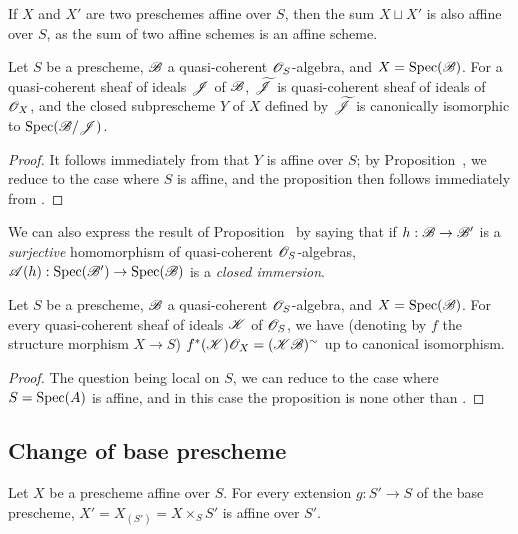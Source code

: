 \begin{remark}[1.4.9]
\label{II.1.4.9}
If $X$ and $X'$ are two preschemes affine over $S$, then the sum $X\sqcup X'$ is also affine over $S$, as the sum of two affine schemes is an affine scheme.
\end{remark}

\begin{proposition}[1.4.10]
\label{II.1.4.10}
Let $S$ be a prescheme, $\mathscr{B}$ a quasi-coherent $\mathscr{O}_S$-algebra, and $X=\operatorname{Spec}(\mathscr{B})$.
For a quasi-coherent sheaf of ideals $\mathscr{J}$ of $\mathscr{B}$, $\widetilde{\mathscr{J}}$ is quasi-coherent sheaf of ideals of $\mathscr{O}_X$, and the closed subprescheme $Y$ of $X$ defined by $\widetilde{\mathscr{J}}$ is canonically isomorphic to $\operatorname{Spec}(\mathscr{B}/\mathscr{J})$.
\end{proposition}

\begin{proof}
It follows immediately from  that $Y$ is affine over $S$; by Proposition~, we reduce to the case where $S$ is affine, and the proposition then follows immediately from .
\end{proof}

We can also express the result of Proposition~ by saying that if $h:\sh{B}\to\sh{B}'$ is a \emph{surjective} homomorphism of quasi-coherent $\mathscr{O}_S$-algebras, $\sh{A}(h):\Spec(\sh{B}')\to\Spec(\sh{B})$ is a \emph{closed immersion}.

\begin{proposition}[1.4.11]
\label{II.1.4.11}
Let $S$ be a prescheme, $\mathscr{B}$ a quasi-coherent $\mathscr{O}_S$-algebra, and $X=\operatorname{Spec}(\mathscr{B})$.
For every quasi-coherent sheaf of ideals $\mathscr{K}$ of $\mathscr{O}_S$, we have (denoting by $f$ the structure morphism $X\to S$) $f^*(\mathscr{K})\mathscr{O}_X=(\mathscr{K}\mathscr{B})^\sim$ up to canonical isomorphism.
\end{proposition}

\begin{proof}
The question being local on $S$, we can reduce to the case where $S=\operatorname{Spec}(A)$ is affine, and in this case the proposition is none other than .
\end{proof}

\subsection{Change of base prescheme}
\label{subsection:II.1.5}

\begin{proposition}[1.5.1]
\label{II.1.5.1}
Let $X$ be a prescheme affine over $S$.
For every extension $g:S'\to S$ of the base prescheme, $X'=X_{(S')}=X\times_S S'$ is affine over $S'$.
\end{proposition}

